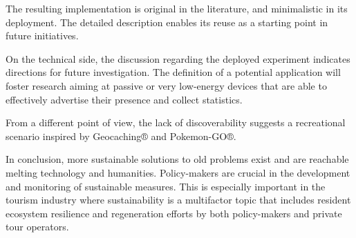 \documentclass[sustainability,article,submit,pdftex,moreauthors]{Definitions/mdpi}
\begin{document}
The resulting implementation is original in the literature, and minimalistic in its deployment. The detailed description enables its reuse as a starting point in future initiatives.

On the technical side, the discussion regarding the deployed experiment indicates directions for future investigation. The definition of a potential application will foster research aiming at passive or very low-energy devices that are able to effectively advertise their presence and collect statistics.

From a different point of view, the lack of discoverability suggests a recreational scenario inspired by Geocaching® and Pokemon-GO®.

In conclusion, more sustainable solutions to old problems exist and are reachable melting technology and humanities. Policy-makers are crucial in the development and monitoring of sustainable measures. This is especially important in the tourism industry where sustainability is a multifactor topic that includes resident ecosystem resilience and regeneration efforts by both policy-makers and private tour operators.



\end{document}
